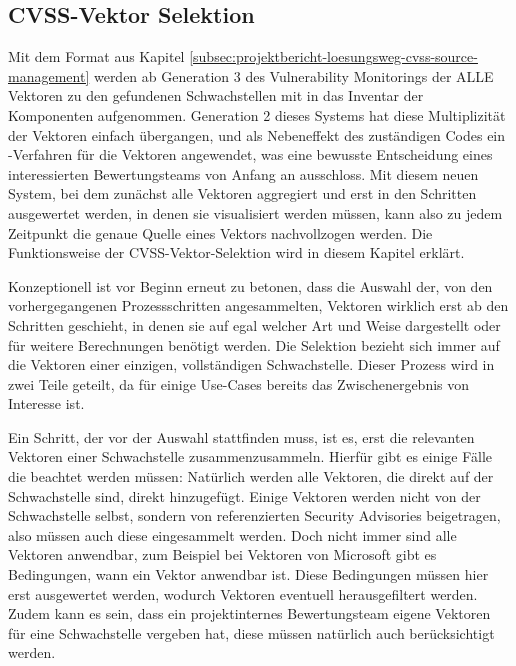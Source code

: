 \subsection{CVSS-Vektor Selektion} \label{subsec:projektbericht-loesungsweg-cvss-selection}

Mit dem Format aus Kapitel \ref{subsec:projektbericht-loesungsweg-cvss-source-management} werden ab Generation 3 des Vulnerability Monitorings der {\metaeffekt} ALLE Vektoren zu den gefundenen Schwachstellen mit in das Inventar der Komponenten aufgenommen.
Generation 2 dieses Systems hat diese Multiplizität der Vektoren einfach übergangen, und als Nebeneffekt des zuständigen Codes ein -Verfahren für die Vektoren angewendet, was eine bewusste Entscheidung eines interessierten Bewertungsteams von Anfang an ausschloss.
Mit diesem neuen System, bei dem zunächst alle Vektoren aggregiert und erst in den Schritten ausgewertet werden, in denen sie visualisiert werden müssen, kann also zu jedem Zeitpunkt die genaue Quelle eines Vektors nachvollzogen werden.
Die Funktionsweise der CVSS-Vektor-Selektion wird in diesem Kapitel erklärt.

Konzeptionell ist vor Beginn erneut zu betonen, dass die Auswahl der, von den vorhergegangenen Prozessschritten angesammelten, Vektoren wirklich erst ab den Schritten geschieht, in denen sie auf egal welcher Art und Weise dargestellt oder für weitere Berechnungen benötigt werden.
Die Selektion bezieht sich immer auf die Vektoren einer einzigen, vollständigen Schwachstelle.
Dieser Prozess wird in zwei Teile geteilt, da für einige Use-Cases bereits das Zwischenergebnis von Interesse ist.

Ein Schritt, der vor der Auswahl stattfinden muss, ist es, erst die relevanten Vektoren einer Schwachstelle zusammenzusammeln.
Hierfür gibt es einige Fälle die beachtet werden müssen:
Natürlich werden alle Vektoren, die direkt auf der Schwachstelle sind, direkt hinzugefügt.
Einige Vektoren werden nicht von der Schwachstelle selbst, sondern von referenzierten Security Advisories beigetragen, also müssen auch diese eingesammelt werden.
Doch nicht immer sind alle Vektoren anwendbar, zum Beispiel bei Vektoren von Microsoft gibt es Bedingungen, wann ein Vektor anwendbar ist.
Diese Bedingungen müssen hier erst ausgewertet werden, wodurch Vektoren eventuell herausgefiltert werden.
Zudem kann es sein, dass ein projektinternes Bewertungsteam eigene Vektoren für eine Schwachstelle vergeben hat, diese müssen natürlich auch berücksichtigt werden.

